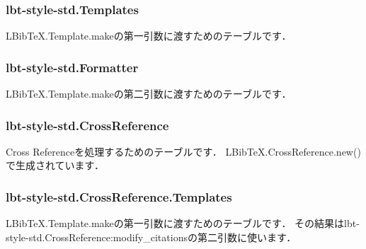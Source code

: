 \documentclass[dvipdfmx,a4paper]{jsarticle}
\begin{document}
\subsubsection{lbt-style-std.Templates}
LBibTeX.Template.makeの第一引数に渡すためのテーブルです．

\subsubsection{lbt-style-std.Formatter}
LBibTeX.Template.makeの第二引数に渡すためのテーブルです．

\subsubsection{lbt-style-std.CrossReference}
Cross Referenceを処理するためのテーブルです．
LBibTeX.CrossReference.new()で生成されています．

\subsubsection{lbt-style-std.CrossReference.Templates}
LBibTeX.Template.makeの第一引数に渡すためのテーブルです．
その結果はlbt-style-std.CrossReference:modify\_citationsの第二引数に使います．
\end{document}

